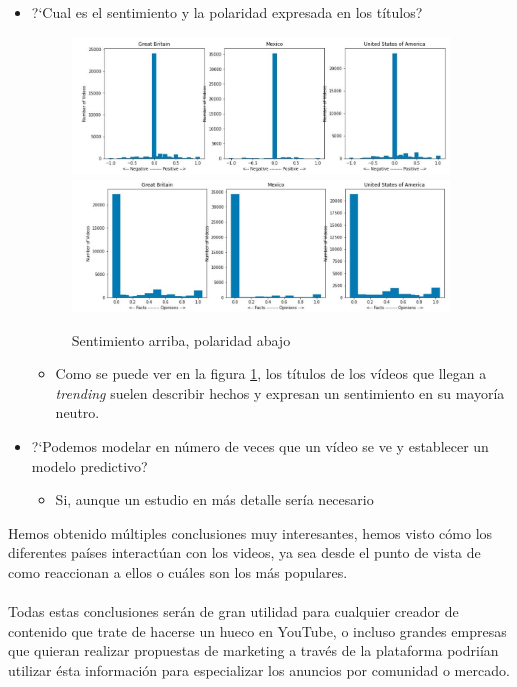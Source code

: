 \documentclass[a4paper,12pt]{article}
\begin{document}
\begin{itemize}
\item ?`Cual es el sentimiento y la polaridad expresada en los t\'itulos?
\begin{figure}[h!]
\centering

\includegraphics[width=10cm]{Sent.JPG}
\includegraphics[width=10cm]{pol.JPG}
\caption{Sentimiento arriba, polaridad abajo}
\label{fig:sentpol}
\end{figure}
\begin{itemize}
\item Como se puede ver en la figura \ref{fig:sentpol}, los t\'itulos de los v\'ideos que llegan a {\itshape trending} suelen describir hechos y expresan un sentimiento en su mayor\'ia neutro.
\end{itemize}
\item ?`Podemos modelar en n\'umero de veces que un v\'ideo se ve y establecer un modelo predictivo?

\begin{itemize}

\item Si, aunque un estudio en m\'as detalle ser\'ia necesario
\end{itemize}
\end{itemize}

Hemos obtenido m\'ultiples conclusiones muy interesantes, hemos visto c\'omo los diferentes pa\'ises interact\'uan con los videos, ya sea desde el punto de vista de como reaccionan a ellos o cu\'ales son los m\'as populares.
\\
\\
Todas estas conclusiones ser\'an de gran utilidad para cualquier creador de contenido que trate de hacerse un hueco en YouTube, o incluso grandes empresas que quieran realizar propuestas de marketing a trav\'es de la plataforma podri\'ian utilizar \'esta informaci\'on para especializar los anuncios por comunidad o mercado.
\end{document}
